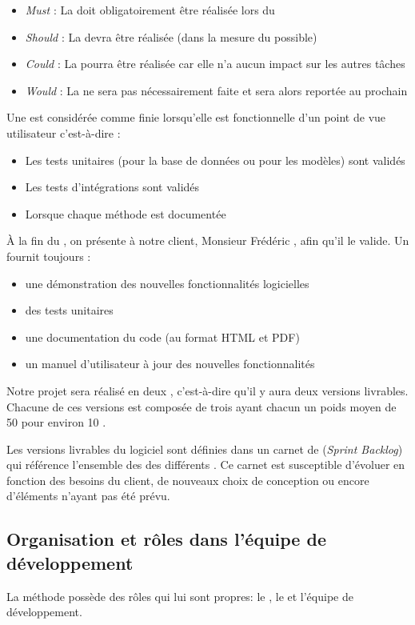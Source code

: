 \begin{itemize}
	\item \textit{Must} : La  doit obligatoirement être réalisée lors du 
	\item \textit{Should} : La  devra être réalisée (dans la mesure du possible)
	\item \textit{Could} : La  pourra être réalisée car elle n’a aucun impact sur les autres tâches
	\item \textit{Would} : La  ne sera pas nécessairement faite et sera alors reportée au prochain 
\end{itemize}

Une   est considérée comme finie lorsqu'elle est fonctionnelle d’un point de vue utilisateur c'est-à-dire :
\begin{itemize}
	\item Les tests unitaires (pour la base de données ou pour les modèles) sont validés
	\item Les tests d’intégrations sont validés
	\item Lorsque chaque méthode est documentée
\end{itemize}

À la fin du , on présente à notre client, Monsieur Frédéric , afin qu'il le valide. Un  fournit toujours :
\begin{itemize}
	\item une démonstration des nouvelles fonctionnalités logicielles
	\item des tests unitaires
	\item une documentation du code (au format HTML et PDF)
	\item un manuel d’utilisateur à jour des nouvelles fonctionnalités
\end{itemize}

Notre projet sera réalisé en deux , c'est-à-dire qu'il y aura deux versions livrables. Chacune de ces versions est composée de trois 
  ayant chacun un poids moyen de 50 pour environ 10 .

Les versions livrables du logiciel sont définies dans un carnet de  (\textit{Sprint Backlog}) qui référence l'ensemble des  des
différents . Ce carnet est susceptible d’évoluer en fonction des besoins du client, de nouveaux choix de conception ou encore d’éléments
n’ayant pas été prévu. 

\subsection{Organisation et rôles dans l'équipe de développement}
La méthode  possède des rôles qui lui sont propres: le , le  et l'équipe de développement. 

